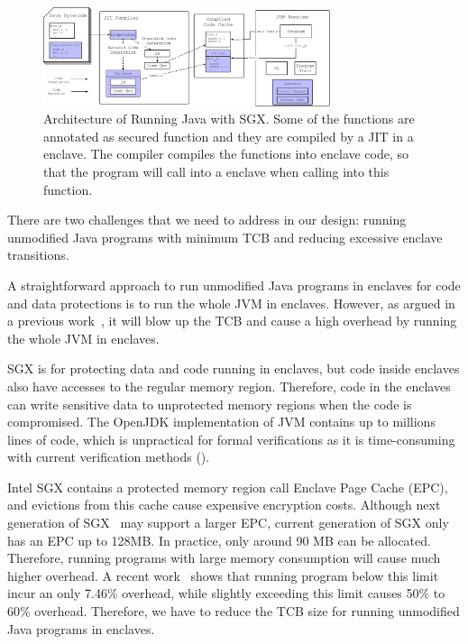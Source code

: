 \begin{figure}[tbh]
  \center
  \includegraphics[width=0.75\textwidth]{figures/jit_arch.ps}
  \caption{Architecture of Running Java with SGX. Some of the functions are
  annotated as secured function and they are compiled by a JIT in a enclave.
  The compiler compiles the functions into enclave code, so that the program 
will
  call into a enclave when calling into this function.}
  \label{arch}
\end{figure}

There are two challenges that we need to address in our design:
running unmodified Java programs with minimum TCB and
reducing excessive enclave transitions.

A straightforward approach to run unmodified Java programs in enclaves for
code and data protections is to run the whole JVM in enclaves.
However, as argued in a previous work~\cite{securekeeper},
it will blow up the TCB and cause a high overhead by running the whole JVM in 
enclaves.

SGX is for protecting data and code running in enclaves, but code inside 
enclaves
also have accesses to the regular memory region. Therefore, code in the enclaves
can write sensitive data to unprotected memory regions when the code is 
compromised.
The OpenJDK implementation of JVM contains up to millions lines of code, which
is unpractical for formal verifications as it is time-consuming with
current verification methods ().

Intel SGX contains a protected memory region call Enclave Page Cache (EPC), and 
evictions
from this cache cause expensive encryption costs.
Although next generation of SGX~\cite{intel-sgx2} may support a larger EPC,
current generation of SGX only has an EPC up to 128MB. In practice, only around
90 MB can be allocated. Therefore, running programs with large memory 
consumption
will cause much higher overhead. A recent work~\cite{opaque:nsdi17} shows that
running program below this limit incur an only 7.46\% overhead, while slightly
exceeding this limit causes 50\% to 60\% overhead.
Therefore, we have to reduce the TCB size for running unmodified Java programs
in enclaves.

